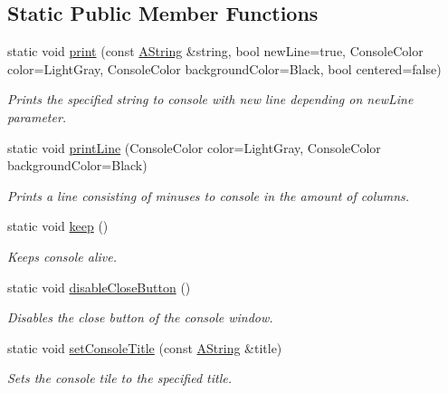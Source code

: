 \subsection*{Static Public Member Functions}
\begin{DoxyCompactItemize}
\item 
static void \mbox{\hyperlink{class_console_a4431c41c8648bc54c933add04e2032e7}{print}} (const \mbox{\hyperlink{class_a_string}{A\+String}} \&string, bool new\+Line=true, Console\+Color color=Light\+Gray, Console\+Color background\+Color=Black, bool centered=false)
\begin{DoxyCompactList}\small\item\em Prints the specified string to console with new line depending on new\+Line parameter. \end{DoxyCompactList}\item 
static void \mbox{\hyperlink{class_console_ad7a14ece00d66f511beadc989c8aa21e}{print\+Line}} (Console\+Color color=Light\+Gray, Console\+Color background\+Color=Black)
\begin{DoxyCompactList}\small\item\em Prints a line consisting of minuses to console in the amount of columns. \end{DoxyCompactList}\item 
static void \mbox{\hyperlink{class_console_a0d9c8a62ea99c6e7cc7b59975785c802}{keep}} ()
\begin{DoxyCompactList}\small\item\em Keeps console alive. \end{DoxyCompactList}\item 
\mbox{\label{class_console_a446e3df3f4aab16d69b4d775bf038146}} 
static void \mbox{\hyperlink{class_console_a446e3df3f4aab16d69b4d775bf038146}{disable\+Close\+Button}} ()
\begin{DoxyCompactList}\small\item\em Disables the close button of the console window. \end{DoxyCompactList}\item 
static void \mbox{\hyperlink{class_console_a897788b6d4f90a73b1894c4a83bb8280}{set\+Console\+Title}} (const \mbox{\hyperlink{class_a_string}{A\+String}} \&title)
\begin{DoxyCompactList}\small\item\em Sets the console tile to the specified title. \end{DoxyCompactList}\item 

\end{DoxyCompactItemize}

